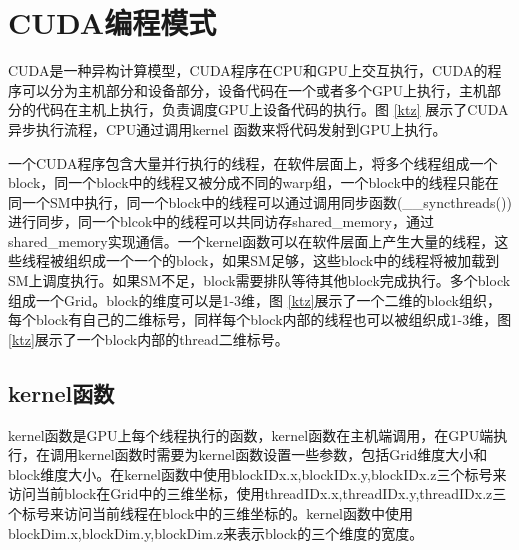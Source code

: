 \section{CUDA编程模式}
CUDA是一种异构计算模型，CUDA程序在CPU和GPU上交互执行，CUDA的程序可以分为主机部分和设备部分，设备代码在一个或者多个GPU上执行，主机部分的代码在主机上执行，负责调度GPU上设备代码的执行。图 \ref{ktz} 展示了CUDA 异步执行流程，CPU通过调用kernel 函数来将代码发射到GPU上执行。


一个CUDA程序包含大量并行执行的线程，在软件层面上，将多个线程组成一个block，同一个block中的线程又被分成不同的warp组，一个block中的线程只能在同一个SM中执行，同一个block中的线程可以通过调用同步函数(\_\_syncthreads())进行同步，同一个blcok中的线程可以共同访存shared\_memory，通过shared\_memory实现通信。一个kernel函数可以在软件层面上产生大量的线程，这些线程被组织成一个一个的block，如果SM足够，这些block中的线程将被加载到SM上调度执行。如果SM不足，block需要排队等待其他block完成执行。多个block组成一个Grid。block的维度可以是1-3维，图 \ref{ktz}展示了一个二维的block组织，每个block有自己的二维标号，同样每个block内部的线程也可以被组织成1-3维，图 \ref{ktz}展示了一个block内部的thread二维标号。

\subsection{kernel函数}
kernel函数是GPU上每个线程执行的函数，kernel函数在主机端调用，在GPU端执行，在调用kernel函数时需要为kernel函数设置一些参数，包括Grid维度大小和block维度大小。在kernel函数中使用blockIDx.x,blockIDx.y,blockIDx.z三个标号来访问当前block在Grid中的三维坐标，使用threadIDx.x,threadIDx.y,threadIDx.z三个标号来访问当前线程在block中的三维坐标的。kernel函数中使用blockDim.x,blockDim.y,blockDim.z来表示block的三个维度的宽度。

